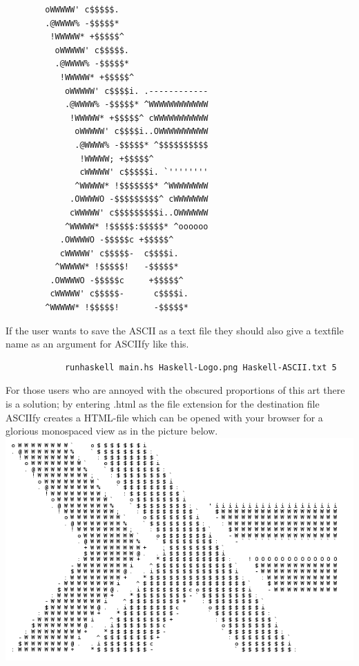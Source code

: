 \documentclass[12pt, a4paper]{article}
\begin{document}
	\begin{scriptsize}
    	\begin{verbatim}
		oWWWWW' c$$$$$.                  
		.@WWWW% -$$$$$*                  
		 !WWWWW* +$$$$$^                 
		  oWWWWW' c$$$$$.                
		  .@WWWW% -$$$$$*                
		   !WWWWW* +$$$$$^               
		    oWWWWW' c$$$$i. .------------
		    .@WWWW% -$$$$$* ^WWWWWWWWWWWW
		     !WWWWW* +$$$$$^ cWWWWWWWWWWW
		      oWWWWW' c$$$$i..OWWWWWWWWWW
		      .@WWWW% -$$$$$* ^$$$$$$$$$$
		       !WWWWW; +$$$$$^           
		       cWWWWW' c$$$$$i. `''''''''
		      ^WWWWW* !$$$$$$$* ^WWWWWWWW
		     .OWWWWO -$$$$$$$$$^ cWWWWWWW
		     cWWWWW' c$$$$$$$$$i..OWWWWWW
		    ^WWWWW* !$$$$$:$$$$$* ^oooooo
		   .OWWWWO -$$$$$c +$$$$$^       
		   cWWWWW' c$$$$$-  c$$$$i.      
		  ^WWWWW* !$$$$$!   -$$$$$*      
		 .OWWWWO -$$$$$c     +$$$$$^     
		 cWWWWW' c$$$$$-      c$$$$i.    
		^WWWWW* !$$$$$!       -$$$$$*    

    	\end{verbatim}  
	\end{scriptsize} 

	If the user wants to save the ASCII as a text file they should also give a textfile name as an argument for ASCIIfy like this.

	\begin{footnotesize}
		\begin{verbatim}
			runhaskell main.hs Haskell-Logo.png Haskell-ASCII.txt 5
		\end{verbatim}
	\end{footnotesize} 

	For those users who are annoyed with the obscured proportions of this art there is a solution; by entering .html as the file extension for the destination file ASCIIfy creates a HTML-file which can be opened with your browser for a glorious monospaced view as in the picture below. \\

	\includegraphics[scale=0.5]{haskell_ascii.png} \\
\end{document}
